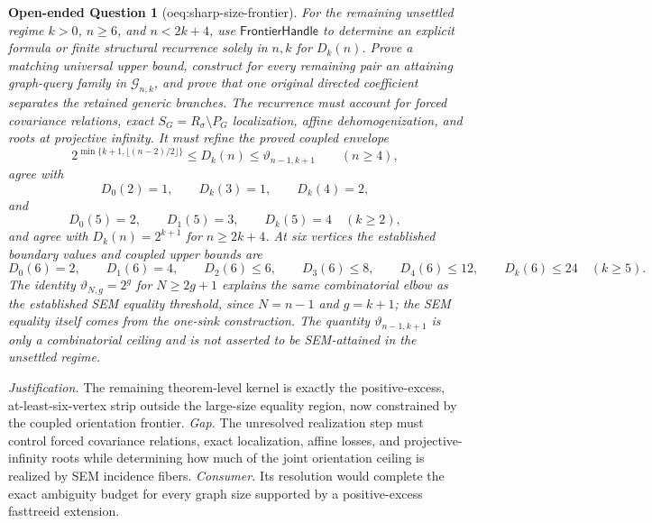 \documentclass{article}
\newtheorem{openendedquestion}{Open-ended Question}
\begin{document}
\begin{openendedquestion}[oeq:sharp-size-frontier]\label{oeq:sharp-size-frontier}
For the remaining unsettled regime \(k>0\), \(n\geq6\), and \(n<2k+4\), use \(\mathsf{FrontierHandle}\) to determine an explicit formula or finite structural recurrence solely in \(n,k\) for \(D_k(n)\).  Prove a matching universal upper bound, construct for every remaining pair an attaining graph-query family in \(\mathcal G_{n,k}\), and prove that one original directed coefficient separates the retained generic branches.  The recurrence must account for forced covariance relations, exact \(S_G=R_{\sigma}\setminus P_G\) localization, affine dehomogenization, and roots at projective infinity.  It must refine the proved coupled envelope
\[
 2^{\min\{k+1,\lfloor(n-2)/2\rfloor\}}
 \leq D_k(n)
 \leq\vartheta_{n-1,k+1}\qquad(n\geq4),
\]
agree with
\[
 D_0(2)=1,\qquad D_k(3)=1,\qquad D_k(4)=2,
\]
and
\[
 D_0(5)=2,\qquad D_1(5)=3,\qquad D_k(5)=4\quad(k\geq2),
\]
and agree with \(D_k(n)=2^{k+1}\) for \(n\geq2k+4\).  At six vertices the established boundary values and coupled upper bounds are
\[
 D_0(6)=2,\qquad D_1(6)=4,\qquad D_2(6)\leq6,
 \qquad D_3(6)\leq8,\qquad D_4(6)\leq12,
 \qquad D_k(6)\leq24\quad(k\geq5).
\]
The identity \(\vartheta_{N,g}=2^g\) for \(N\geq2g+1\) explains the same combinatorial elbow as the established SEM equality threshold, since \(N=n-1\) and \(g=k+1\); the SEM equality itself comes from the one-sink construction.  The quantity \(\vartheta_{n-1,k+1}\) is only a combinatorial ceiling and is not asserted to be SEM-attained in the unsettled regime.
\end{openendedquestion}
\par\smallskip\noindent \textit{Justification.} The remaining theorem-level kernel is exactly the positive-excess, at-least-six-vertex strip outside the large-size equality region, now constrained by the coupled orientation frontier. \textit{Gap.} The unresolved realization step must control forced covariance relations, exact localization, affine losses, and projective-infinity roots while determining how much of the joint orientation ceiling is realized by SEM incidence fibers. \textit{Consumer.} Its resolution would complete the exact ambiguity budget for every graph size supported by a positive-excess fasttreeid extension.
\end{document}
